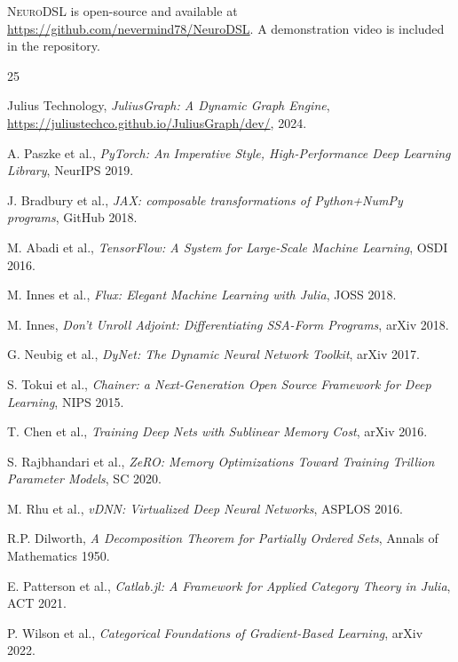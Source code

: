 \documentclass{article}
\begin{document}
\textsc{NeuroDSL} is open-source and available at \url{https://github.com/nevermind78/NeuroDSL}. A demonstration video is included in the repository.

\begin{thebibliography}{25}

Julius Technology, \textit{JuliusGraph: A Dynamic Graph Engine}, \url{https://juliustechco.github.io/JuliusGraph/dev/}, 2024.

A. Paszke et al., \textit{PyTorch: An Imperative Style, High-Performance Deep Learning Library}, NeurIPS 2019.

J. Bradbury et al., \textit{JAX: composable transformations of Python+NumPy programs}, GitHub 2018.

M. Abadi et al., \textit{TensorFlow: A System for Large-Scale Machine Learning}, OSDI 2016.

M. Innes et al., \textit{Flux: Elegant Machine Learning with Julia}, JOSS 2018.

M. Innes, \textit{Don't Unroll Adjoint: Differentiating SSA-Form Programs}, arXiv 2018.

G. Neubig et al., \textit{DyNet: The Dynamic Neural Network Toolkit}, arXiv 2017.

S. Tokui et al., \textit{Chainer: a Next-Generation Open Source Framework for Deep Learning}, NIPS 2015.

T. Chen et al., \textit{Training Deep Nets with Sublinear Memory Cost}, arXiv 2016.

S. Rajbhandari et al., \textit{ZeRO: Memory Optimizations Toward Training Trillion Parameter Models}, SC 2020.

M. Rhu et al., \textit{vDNN: Virtualized Deep Neural Networks}, ASPLOS 2016.

R.P. Dilworth, \textit{A Decomposition Theorem for Partially Ordered Sets}, Annals of Mathematics 1950.

E. Patterson et al., \textit{Catlab.jl: A Framework for Applied Category Theory in Julia}, ACT 2021.

P. Wilson et al., \textit{Categorical Foundations of Gradient-Based Learning}, arXiv 2022.


\end{thebibliography}
\end{document}
